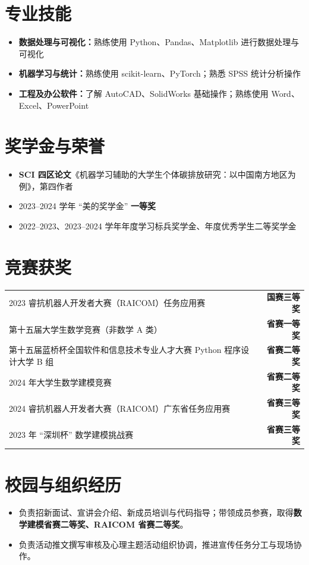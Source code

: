 \documentclass{resume}
\begin{document}
\section{专业技能}
\begin{itemize}[parsep=0.1ex]
  \item \textbf{数据处理与可视化：}熟练使用 Python、Pandas、Matplotlib 进行数据处理与可视化
  \item \textbf{机器学习与统计：}熟练使用 scikit-learn、PyTorch；熟悉 SPSS 统计分析操作
  \item \textbf{工程及办公软件：}了解 AutoCAD、SolidWorks 基础操作；熟练使用 Word、Excel、PowerPoint
\end{itemize}

\section{奖学金与荣誉}
\begin{itemize}[parsep=0.1ex]
  \item \textbf{SCI 四区论文}《机器学习辅助的大学生个体碳排放研究：以中国南方地区为例》，第四作者
  \item 2023--2024 学年 ``美的奖学金'' \textbf{一等奖}
  \item 2022--2023、2023--2024 学年年度学习标兵奖学金、年度优秀学生二等奖学金
\end{itemize}

\section{竞赛获奖}
\begin{tabularx}{\textwidth}{@{}Xr@{}}
2023 睿抗机器人开发者大赛（RAICOM）任务应用赛 & \textbf{国赛三等奖} \\
第十五届大学生数学竞赛（非数学 A 类） & \textbf{省赛一等奖} \\
第十五届蓝桥杯全国软件和信息技术专业人才大赛 Python 程序设计大学 B 组 & \textbf{省赛二等奖} \\
2024 年大学生数学建模竞赛 & \textbf{省赛二等奖} \\
2024 睿抗机器人开发者大赛（RAICOM）广东省任务应用赛 & \textbf{省赛三等奖} \\
2023 年 ``深圳杯'' 数学建模挑战赛 & \textbf{省赛三等奖} \\
\end{tabularx}

\section{校园与组织经历}
\begin{itemize}[parsep=0.1ex]
  \item 负责招新面试、宣讲会介绍、新成员培训与代码指导；带领成员参赛，取得\textbf{数学建模省赛二等奖、RAICOM 省赛二等奖}。
\end{itemize}
\begin{itemize}[parsep=0.1ex]
  \item 负责活动推文撰写审核及心理主题活动组织协调，推进宣传任务分工与现场协作。
\end{itemize}
\end{document}
